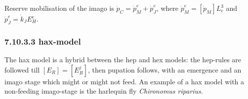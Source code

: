 Reserve mobilisation of the imago is $\dot{p}_C = \dot{p}_M^e + \dot{p}_J^e$, where $\dot{p}_M^e = [\dot{p}_M] L_e^3$ and $\dot{p}_J^e = \dot{k}_J E_H^e$.

\subsubsection*{7.10.3.3 hax-model}
{}
\label{sec_c:hax}

The hax model is a hybrid between the hep and hex models: the hep-rules are followed till $[E_R] = [E_R^j]$, then pupation follows, with an emergence and an imago stage which might or might not feed. 
An example of a hax model with a non-feeding imago-stage is the harlequin fly \emph{Chironomus riparius}.
